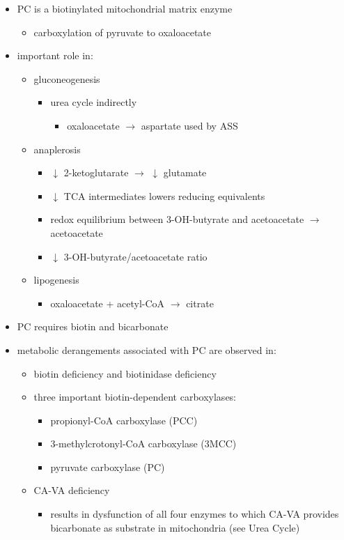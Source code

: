 \documentclass{scrartcl}
\begin{document}
\begin{itemize}
\item PC is a biotinylated mitochondrial matrix enzyme
\begin{itemize}
\item carboxylation of pyruvate to oxaloacetate
\end{itemize}


\item important role in:
\begin{itemize}
\item gluconeogenesis
\begin{itemize}
\item urea cycle indirectly
\begin{itemize}
\item oxaloacetate \(\to\) aspartate used by ASS
\end{itemize}
\end{itemize}
\item anaplerosis
\begin{itemize}
\item \(\downarrow\) 2-ketoglutarate \(\to\) \(\downarrow\) glutamate
\item \(\downarrow\) TCA intermediates lowers reducing equivalents
\item redox equilibrium between 3-OH-butyrate and acetoacetate \(\to\) acetoacetate
\item \(\downarrow\) 3-OH-butyrate/acetoacetate ratio
\end{itemize}
\item lipogenesis
\begin{itemize}
\item oxaloacetate + acetyl-CoA \(\to\) citrate
\end{itemize}
\end{itemize}

\item PC requires biotin and bicarbonate
\item metabolic derangements associated with PC are observed in:
\begin{itemize}
\item biotin deficiency and biotinidase deficiency
\item three important biotin-dependent carboxylases:
\begin{itemize}
\item propionyl-CoA carboxylase (PCC)
\item 3-methylcrotonyl-CoA carboxylase (3MCC)
\item pyruvate carboxylase (PC)
\end{itemize}

\item CA-VA deficiency
\begin{itemize}
\item results in dysfunction of all four enzymes to which CA-VA
provides bicarbonate as substrate in mitochondria (see Urea Cycle)
\end{itemize}
\end{itemize}
\end{itemize}
\end{document}
